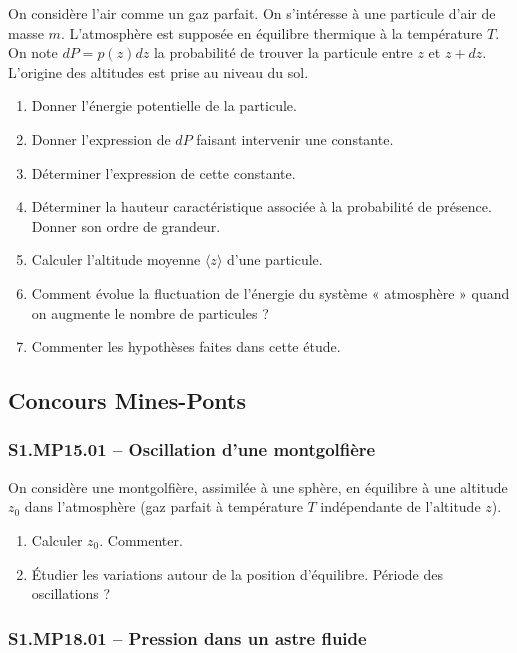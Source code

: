 On considère l'air comme un gaz parfait. On s'intéresse à une particule d'air de masse $m$. L'atmosphère est supposée en équilibre thermique à la température $T$. On note $dP = p(z)dz$ la probabilité de trouver la particule entre $z$ et $z + dz$. L'origine des altitudes est prise au niveau du sol.

\begin{enumerate}
\item Donner l'énergie potentielle de la particule.
\item Donner l'expression de $dP$ faisant intervenir une constante.
\item Déterminer l'expression de cette constante.
\item Déterminer la hauteur caractéristique associée à la probabilité de présence. Donner son ordre de grandeur.
\item Calculer l'altitude moyenne $\langle z \rangle$ d'une particule.
\item Comment évolue la fluctuation de l'énergie du système « atmosphère » quand on augmente le nombre de particules ?
\item Commenter les hypothèses faites dans cette étude.
\end{enumerate}

\newpage
\subsection*{Concours Mines-Ponts}

\subsubsection*{S1.MP15.01 -- Oscillation d'une montgolfière  \lesdeux}

On considère une montgolfière, assimilée à une sphère, en équilibre à une altitude $z_{0}$ dans l'atmosphère (gaz parfait à température $T$ indépendante de l'altitude $z$).

\begin{enumerate}
\item Calculer $z_{0}$. Commenter.
\item Étudier les variations autour de la position d'équilibre. Période des oscillations ?
\end{enumerate}

\subsubsection*{S1.MP18.01 -- Pression dans un astre fluide  \lesdeux}

